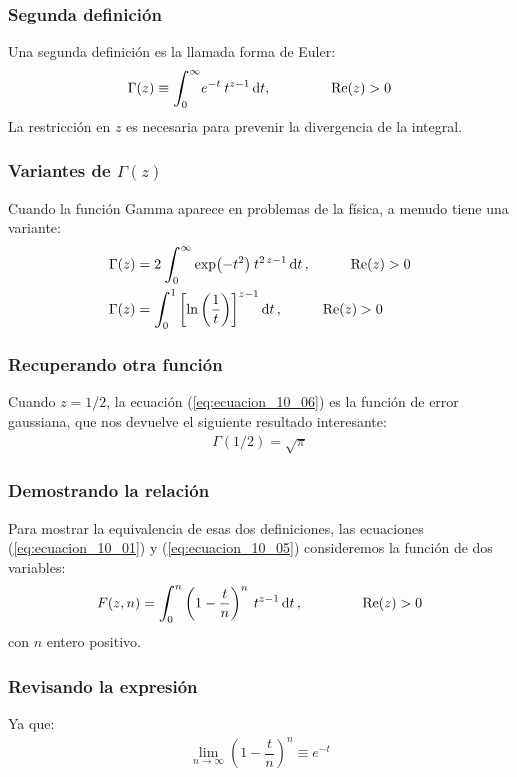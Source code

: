 \documentclass[12pt]{beamer}
\begin{document}
\begin{frame}
\frametitle{Segunda definición}
Una segunda definición es la llamada forma de Euler:
\pause
\begin{align}
\Gamma (z) \equiv \scaleint{6ex}_{\bs 0}^{\infty} e^{-t} \: t^{z - 1} \, \dd t, \hspace{1.5cm} \Re(z) > 0
\label{eq:ecuacion_10_05}
\end{align}
La restricción en $z$ es necesaria para prevenir la divergencia de la integral.
\end{frame}
\begin{frame}
\frametitle{Variantes de $\Gamma (z)$}
Cuando la función Gamma aparece en problemas de la física, a menudo tiene una variante:
\pause
\begin{align}
\Gamma (z) &= 2 \: \scaleint{6ex}_{\bs 0}^{\infty} \exp(-t^{2}) \: t^{2 \, z - 1} \dd{t}, \hspace{1cm} \Re(z) > 0  \label{eq:ecuacion_10_06} \\
\Gamma (z) &=  \scaleint{6ex}_{\bs 0}^{1} \left[ \ln\left(\dfrac{1}{t} \right) \right]^{z - 1} \dd{t}, \hspace{1cm} \Re (z) > 0 \label{eq:ecuacion_10_07}
\end{align}
\end{frame}
\begin{frame}
\frametitle{Recuperando otra función}
Cuando $z = 1/2$, la ecuación (\ref{eq:ecuacion_10_06}) es la función de error gaussiana, que nos devuelve el siguiente resultado interesante:
\pause
\begin{align}
\Gamma (1/2) = \sqrt{\pi}
\label{eq:ecuacion_10_08}
\end{align}
\end{frame}
\begin{frame}
\frametitle{Demostrando la relación}
Para mostrar la equivalencia de esas dos definiciones, las ecuaciones (\ref{eq:ecuacion_10_01}) y (\ref{eq:ecuacion_10_05}) consideremos la función de dos variables:
\pause
\begin{align}
F(z, n) = \scaleint{6ex}_{\bs 0}^{n} \left( 1 - \dfrac{t}{n} \right)^{n} \: t^{z - 1} \dd{t}, \hspace{1.5cm} \Re(z) > 0
\label{eq:ecuacion_10_09}
\end{align}
con $n$ entero positivo.
\end{frame}
\begin{frame}
\frametitle{Revisando la expresión}
Ya que:
\pause
\begin{align}
\lim_{n \to \infty} \left( 1 - \dfrac{t}{n} \right)^{n} \equiv e^{-t}
\label{eq:ecuacion_10_10}
\end{align}
\end{frame}
\end{document}
